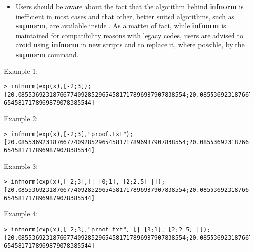 \begin{itemize}
\item Users should be aware about the fact that the algorithm behind
   \textbf{infnorm} is inefficient in most cases and that other, better suited
   algorithms, such as \textbf{supnorm}, are available inside \sollya. As a
   matter of fact, while \textbf{infnorm} is maintained for compatibility reasons
   with legacy \sollya codes, users are advised to avoid using \textbf{infnorm}
   in new \sollya scripts and to replace it, where possible, by the
   \textbf{supnorm} command.
\end{itemize}
\noindent Example 1: 
\begin{center}\begin{minipage}{15cm}\begin{Verbatim}[frame=single,commandchars=\\\|\~]
> infnorm(exp(x),[-2;3]);
[20.085536923187667740928529654581717896987907838554;20.085536923187667740928529
6545817178969879078385544]
\end{Verbatim}
\end{minipage}\end{center}
\noindent Example 2: 
\begin{center}\begin{minipage}{15cm}\begin{Verbatim}[frame=single,commandchars=\\\|\~]
> infnorm(exp(x),[-2;3],"proof.txt");
[20.085536923187667740928529654581717896987907838554;20.085536923187667740928529
6545817178969879078385544]
\end{Verbatim}
\end{minipage}\end{center}
\noindent Example 3: 
\begin{center}\begin{minipage}{15cm}\begin{Verbatim}[frame=single,commandchars=\\\|\~]
> infnorm(exp(x),[-2;3],[| [0;1], [2;2.5] |]);
[20.085536923187667740928529654581717896987907838554;20.085536923187667740928529
6545817178969879078385544]
\end{Verbatim}
\end{minipage}\end{center}
\noindent Example 4: 
\begin{center}\begin{minipage}{15cm}\begin{Verbatim}[frame=single,commandchars=\\\|\~]
> infnorm(exp(x),[-2;3],"proof.txt", [| [0;1], [2;2.5] |]);
[20.085536923187667740928529654581717896987907838554;20.085536923187667740928529
6545817178969879078385544]
\end{Verbatim}
\end{minipage}\end{center}
